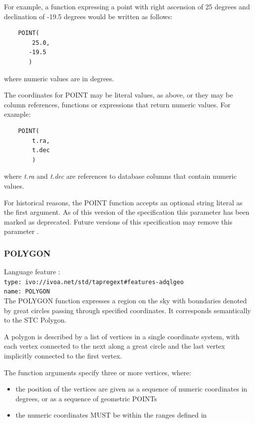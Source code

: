 \documentclass[11pt,a4paper]{ivoa}
\begin{document}
For example, a function expressing a point with right ascension of 25 degrees
and declination of -19.5 degrees would be written as follows:
\begin{verbatim}
    POINT(
        25.0,
       -19.5
       )
\end{verbatim}
\noindent
where numeric values are in degrees.

The coordinates for POINT may be literal values, as above,
or they may be column references, functions or expressions that return
numeric values.
For example:
\begin{verbatim}
    POINT(
        t.ra,
        t.dec
        )
\end{verbatim}
\noindent
where \textit{t.ra} and \textit{t.dec} are references to database
columns that contain numeric values.

For historical reasons, the POINT function accepts an optional string literal
as the first argument.
As of this version of the specification this parameter has been
marked as deprecated.
Future versions of this specification may remove this parameter
.

\subsubsection{POLYGON}
\label{sec:functions.geom.polygon}
{\footnotesize Language feature :}\\
{\footnotesize \verb|type: ivo://ivoa.net/std/tapregext#features-adqlgeo|}\\
{\footnotesize \verb|name: POLYGON|}\\

The POLYGON function expresses a region on the sky with boundaries denoted by great
circles passing through specified coordinates. It corresponds semantically
to the STC Polygon.

A polygon is described by a list of vertices in a single coordinate system, with
each vertex connected to the next along a great circle and the last vertex
implicitly connected to the first vertex.

The function arguments specify three or more vertices, where:
\begin{itemize}
    \item the position of the vertices are given as a sequence of
    numeric coordinates in degrees, or as a sequence of geometric POINTs
    \item the numeric coordinates MUST be within the ranges defined in
\end{itemize}
\end{document}
